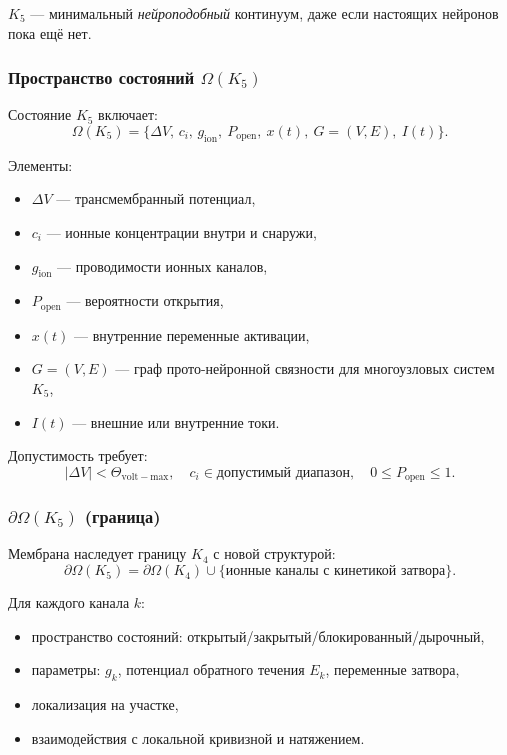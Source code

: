 $K_5$ — минимальный \emph{нейроподобный} континуум, даже если
настоящих нейронов пока ещё нет.

\subsubsection{Пространство состояний \texorpdfstring{$\Omega(K_5)$}{\Omega(K_5)}}

Состояние $K_5$ включает:
\[
\Omega(K_5) = \{ \Delta V,\, c_i,\, g_{\mathrm{ion}},\
                P_{\mathrm{open}},\
                x(t),\
                G=(V,E),\
                I(t) \}.
\]

Элементы:
\begin{itemize}
    \item $\Delta V$ — трансмембранный потенциал,
    \item $c_i$ — ионные концентрации внутри и снаружи,
    \item $g_{\mathrm{ion}}$ — проводимости ионных каналов,
    \item $P_{\mathrm{open}}$ — вероятности открытия,
    \item $x(t)$ — внутренние переменные активации,
    \item $G=(V,E)$ — граф прото-нейронной связности для многоузловых систем
          $K_5$,
    \item $I(t)$ — внешние или внутренние токи.
\end{itemize}

Допустимость требует:
\[
|\Delta V| < \Theta_{\mathrm{volt-max}}, \quad
  c_i \in \text{допустимый диапазон}, \quad
0 \le P_{\mathrm{open}} \le 1.
\]

\subsubsection{\texorpdfstring{$\partial\Omega(K_5)$}{\partial\Omega(K_5)} (граница)}

Мембрана наследует границу $K_4$ с новой структурой:
\[
\partial\Omega(K_5)
    = \partial\Omega(K_4)
       \cup \{ \text{ионные каналы с кинетикой затвора} \}.
\]

Для каждого канала $k$:
\begin{itemize}
    \item пространство состояний: открытый/закрытый/блокированный/дырочный,
    \item параметры: $g_k$, потенциал обратного течения $E_k$, переменные
          затвора,
    \item локализация на участке,
    \item взаимодействия с локальной кривизной и натяжением.
\end{itemize}

